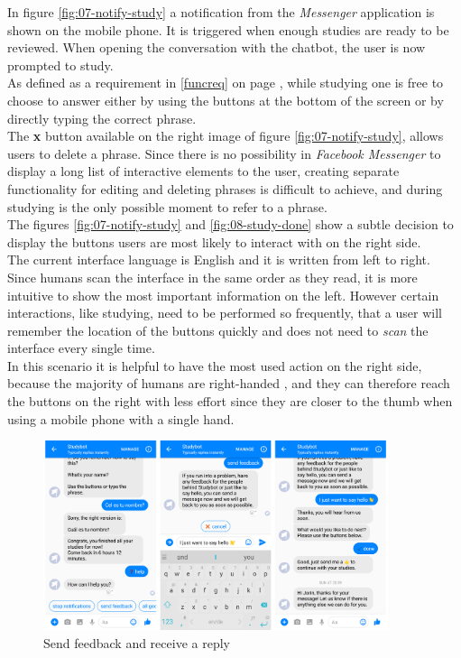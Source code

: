 In figure \ref{fig:07-notify-study} a notification from the \emph{Messenger} application is shown on the mobile phone.
It is triggered when enough studies are ready to be reviewed.
When opening the conversation with the chatbot,
the user is now prompted to study.
\\
As defined as a requirement in \ref{funcreq} on page \pageref{funcreq},
while studying one is free to choose to answer either by using the buttons at the bottom of the screen
or by directly typing the correct phrase.
\\
The \textbf{x} button available on the right image of figure \ref{fig:07-notify-study},
allows users to delete a phrase.
Since there is no possibility in \emph{Facebook Messenger} to display a long list of interactive elements to the user,
creating separate functionality for editing and deleting phrases is difficult to achieve,
and during studying is the only possible moment to refer to a phrase.
\\

The figures \ref{fig:07-notify-study} and \ref{fig:08-study-done} show a subtle decision to display the buttons users are most likely to interact with
on the right side.
\\

The current interface language is English and it is written from left to right.
Since humans scan the interface in the same order as they read,
it is more intuitive to show the most important information on the left.
However certain interactions, like studying, need to be performed so frequently,
that a user will remember the location of the buttons quickly and does not need to \emph{scan} the interface every single time.
\\
In this scenario it is helpful to have the most used action on the right side, because the majority of humans are right-handed \cite{righthand},
and they can therefore reach the buttons on the right with less effort since they are closer to the thumb when using a mobile phone with a single hand.
\\

\begin{figure}[h]
  \centering
  \includegraphics[width=0.9\textwidth]{images/interface/09-feedback.png}
	\caption{Send feedback and receive a reply}
	\label{fig:09-feedback}
\end{figure}

